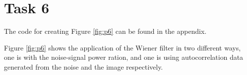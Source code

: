 \section{Task 6}
The code for creating Figure \ref{fig:p6} can be found in the appendix.


Figure \ref{fig:p6} shows the application of the Wiener filter in two different ways, one is with the noise-signal power ration,
and one is using autocorrelation data generated from the noise and the image respectively.